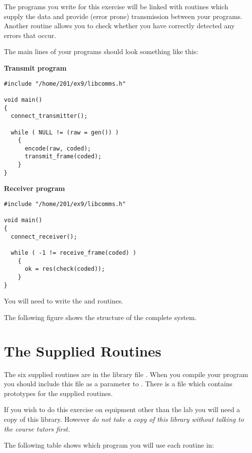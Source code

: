 \documentclass[a4paper,10pt]{article}
\begin{document}
The programs you write for this exercise will be linked with routines which
supply the data and provide (error prone) transmission between your
programs.  Another routine allows you to check whether you have correctly
detected any errors that occur.

\newpage
The main lines of your programs should look something like this:

{\bf Transmit program}

\begin{verbatim}
#include "/home/201/ex9/libcomms.h"

void main()
{
  connect_transmitter();

  while ( NULL != (raw = gen()) )
    {
      encode(raw, coded);
      transmit_frame(coded);
    }
}
\end{verbatim}

{\bf Receiver program}

\begin{verbatim}
#include "/home/201/ex9/libcomms.h"

void main()
{
  connect_receiver();

  while ( -1 != receive_frame(coded) )
    {
      ok = res(check(coded));
    }
}
\end{verbatim}

You will need to write the  and  routines.

The following figure shows the structure of the complete system.

\begin{center}
\end{center}

\newpage
\section{The Supplied Routines}

The six supplied routines are in the library file
.  When you compile your program you
should include this file as a parameter to .  There is a
 file which contains prototypes for the
supplied routines.

If you wish to do this exercise on equipment other than the lab you
will need a copy of this library.  However {\em do not take a copy of
this library without talking to the course tutors first.}

The following table shows which program you will use each routine in:
\vspace{1cm}
\end{document}
